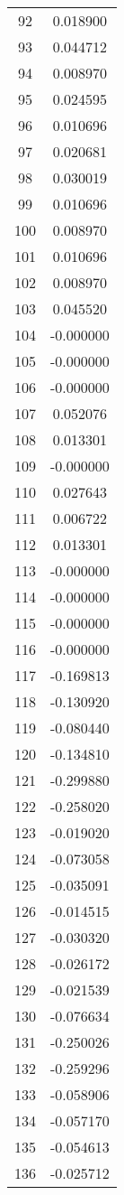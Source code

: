 \documentclass[12pt]{article}
\begin{document}
\begin{longtable}{@{}cc@{}}
92 & 0.018900 \\
93 & 0.044712 \\
94 & 0.008970 \\
95 & 0.024595 \\
96 & 0.010696 \\
97 & 0.020681 \\
98 & 0.030019 \\
99 & 0.010696 \\
100 & 0.008970 \\
101 & 0.010696 \\
102 & 0.008970 \\
103 & 0.045520 \\
104 & -0.000000 \\
105 & -0.000000 \\
106 & -0.000000 \\
107 & 0.052076 \\
108 & 0.013301 \\
109 & -0.000000 \\
110 & 0.027643 \\
111 & 0.006722 \\
112 & 0.013301 \\
113 & -0.000000 \\
114 & -0.000000 \\
115 & -0.000000 \\
116 & -0.000000 \\
117 & -0.169813 \\
118 & -0.130920 \\
119 & -0.080440 \\
120 & -0.134810 \\
121 & -0.299880 \\
122 & -0.258020 \\
123 & -0.019020 \\
124 & -0.073058 \\
125 & -0.035091 \\
126 & -0.014515 \\
127 & -0.030320 \\
128 & -0.026172 \\
129 & -0.021539 \\
130 & -0.076634 \\
131 & -0.250026 \\
132 & -0.259296 \\
133 & -0.058906 \\
134 & -0.057170 \\
135 & -0.054613 \\
136 & -0.025712 \\

\end{longtable}
\end{document}
